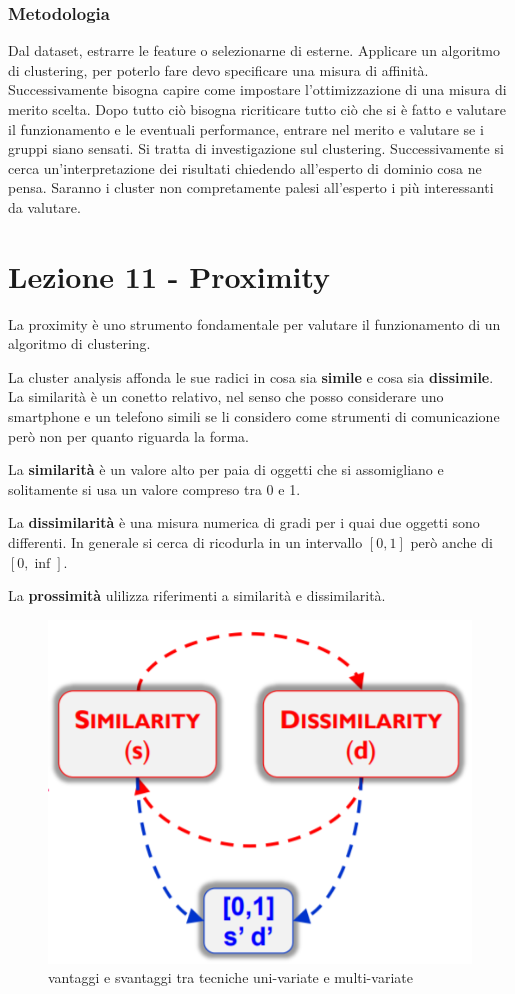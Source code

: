 \subsubsection{Metodologia}
Dal dataset, estrarre le feature o selezionarne di esterne. Applicare un algoritmo di clustering, per poterlo fare devo specificare una misura di affinit\`a. Successivamente bisogna capire come impostare l'ottimizzazione di una misura di merito scelta. Dopo tutto ci\`o bisogna ricriticare tutto ci\`o che si \`e fatto e valutare il funzionamento e le eventuali performance, entrare nel merito e valutare se i gruppi siano sensati. Si tratta di investigazione sul clustering. Successivamente si cerca un'interpretazione dei risultati chiedendo all'esperto di dominio cosa ne pensa. Saranno i cluster non compretamente palesi all'esperto i pi\`u interessanti da valutare. 

\section{Lezione 11 - Proximity}

La proximity \`e uno strumento fondamentale per valutare il funzionamento di un algoritmo di clustering. 

La cluster analysis affonda le sue radici in cosa sia \textbf{simile} e cosa sia \textbf{dissimile}. La similarit\`a \`e un conetto relativo, nel senso che posso considerare uno smartphone e un telefono simili se li considero come strumenti di comunicazione per\`o non per quanto riguarda la forma.

La \textbf{similarit\`a} \`e un valore alto per paia di oggetti che si assomigliano e solitamente si usa un valore compreso tra 0 e 1. 

La \textbf{dissimilarit\`a} \`e una misura numerica di gradi per i quai due oggetti sono differenti. In generale si cerca di ricodurla in un intervallo $[0,1]$ per\`o anche di $[0,\inf]$.

La \textbf{prossimit\`a} ulilizza riferimenti a similarit\`a e dissimilarit\`a.

\begin{figure}[h!]
	\centering
	\includegraphics[height=0.45 \linewidth]{pict/simil_diss.png}
	\caption{vantaggi e svantaggi tra tecniche uni-variate e multi-variate}
\end{figure}

